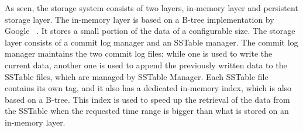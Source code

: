 As seen, the storage system consists of two layers, in-memory layer and persistent storage layer. The in-memory layer is based on a B-tree implementation by Google~\cite{btree_google} . It stores a small portion of the data of a configurable size. The storage layer consists of a commit log manager and an SSTable manager. The commit log manager maintains the two commit log files; while one is used to write the current data, another one is used to append the previously written data to the SSTable files, which are managed by SSTable Manager. Each SSTable file contains its own tag, and it also has a dedicated in-memory index, which is also based on a B-tree. This index is used to speed up the retrieval of the data from the SSTable when the requested time range is bigger than what is stored on an in-memory layer.